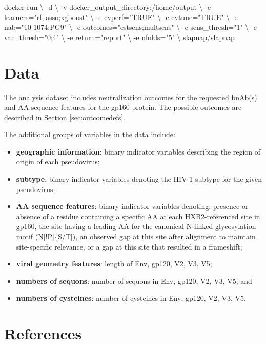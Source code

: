 \documentclass[]{article}
\newenvironment{Shaded}{\begin{snugshade}}{\end{snugshade}}
\newcommand{\StringTok}[1]{\textcolor[rgb]{0.31,0.60,0.02}{#1}}
\newcommand{\ExtensionTok}[1]{#1}
\newcommand{\NormalTok}[1]{#1}
\providecommand{\tightlist}{%
  \setlength{\itemsep}{0pt}\setlength{\parskip}{0pt}}
\begin{document}
\begin{Shaded}
\begin{Highlighting}[]
\ExtensionTok{docker}\NormalTok{ run \textbackslash{}}
\NormalTok{  -d \textbackslash{}}
\NormalTok{  -v docker_output_directory:/home/output \textbackslash{}}
\NormalTok{  -e learners=}\StringTok{"rf;lasso;xgboost"}\NormalTok{ \textbackslash{}}
\NormalTok{  -e cvperf=}\StringTok{"TRUE"}\NormalTok{ \textbackslash{}}
\NormalTok{  -e cvtune=}\StringTok{"TRUE"}\NormalTok{ \textbackslash{}}
\NormalTok{  -e nab=}\StringTok{"10-1074;PG9"}\NormalTok{ \textbackslash{}}
\NormalTok{  -e outcomes=}\StringTok{"estsens;multsens"}\NormalTok{ \textbackslash{}}
\NormalTok{  -e sens_thresh=}\StringTok{"1"}\NormalTok{ \textbackslash{}}
\NormalTok{  -e var_thresh=}\StringTok{"0;4"}\NormalTok{ \textbackslash{}}
\NormalTok{  -e return=}\StringTok{"report"}\NormalTok{ \textbackslash{}}
\NormalTok{  -e nfolds=}\StringTok{"5"}\NormalTok{ \textbackslash{}}
\NormalTok{  slapnap/slapnap}
\end{Highlighting}
\end{Shaded}

\section{Data}\label{sec:data}

The analysis dataset includes neutralization outcomes for the requested
bnAb(s) and AA sequence features for the gp160 protein. The possible
outcomes are described in Section \ref{sec:outcomedefs}.

The additional groups of variables in the data include:

\begin{itemize}
\tightlist
\item
  \textbf{geographic information}: binary indicator variables describing
  the region of origin of each pseudovirus;
\item
  \textbf{subtype}: binary indicator variables denoting the HIV-1
  subtype for the given pseudovirus;
\item
  \textbf{AA sequence features}: binary indicator variables denoting:
  presence or absence of a residue containing a specific AA at each
  HXB2-referenced site in gp160, the site having a leading AA for the
  canonical N-linked glycosylation motif (N{[}!P{]}\{S/T{]}), an
  observed gap at this site after alignment to maintain site-specific
  relevance, or a gap at this site that resulted in a frameshift;
\item
  \textbf{viral geometry features}: length of Env, gp120, V2, V3, V5;
\item
  \textbf{numbers of sequons}: number of sequons in Env, gp120, V2, V3,
  V5; and
\item
  \textbf{numbers of cysteines}: number of cysteines in Env, gp120, V2,
  V3, V5.
\end{itemize}

\section{References}\label{sec:refs}


\end{document}
